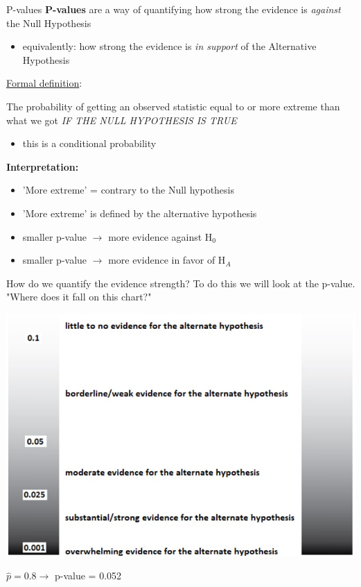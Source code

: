 \documentclass{beamer}
\begin{document}
\begin{frame}{P-values}
\textbf{P-values} are a way of quantifying how strong the evidence is \textit{against} the Null Hypothesis
\begin{itemize}
    \item equivalently: how strong the evidence is \textit{in support} of the Alternative Hypothesis
\end{itemize} \vspace{6mm}

\underline{Formal definition}:

The probability of getting an observed statistic equal to or more extreme than what we got \textit{IF THE NULL HYPOTHESIS IS TRUE}
\begin{itemize}
    \item this is a conditional probability
\end{itemize} \vspace{6mm}

\textbf{Interpretation:}
\begin{itemize}
    \item 'More extreme' = contrary to the Null hypothesis
    \item 'More extreme' is defined by the alternative hypothesis
    \item smaller p-value $\rightarrow$ more evidence against H$_0$
    \item smaller p-value $\rightarrow$ more evidence in favor of H$_A$
\end{itemize}
\end{frame}

\begin{frame}{How do we quantify the evidence strength?}
To do this we will look at the p-value. "Where does it fall on this chart?"
\begin{center}
    \includegraphics[scale=.6]{img/strength_chart.jpg}
\end{center}
$\widehat{p} = 0.8 \rightarrow$ p-value = 0.052
\end{frame}
\end{document}

